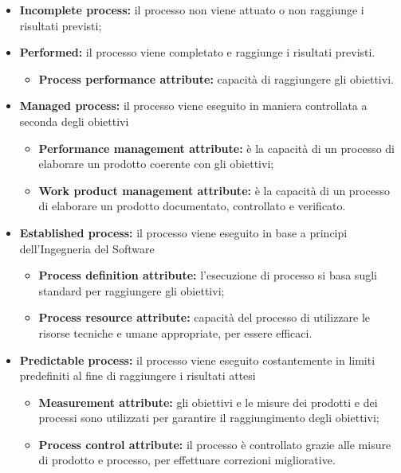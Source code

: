 \begin{itemize}
	\item \textbf{Incomplete process:} il processo non viene attuato o non raggiunge i risultati previsti;
	
	\item \textbf{Performed:} il processo viene completato e raggiunge i risultati previsti.
	\begin{itemize}
		\item\textbf{Process performance attribute:} capacità di raggiungere 
		gli obiettivi.
	\end{itemize}
	
	\item \textbf{Managed process:} il processo viene eseguito in maniera controllata a seconda degli obiettivi
	\begin{itemize}
		\item \textbf{Performance management attribute:} è la capacità di un processo di elaborare un prodotto coerente con gli obiettivi;
		\item \textbf{Work product management attribute:} è la capacità di un processo di elaborare un prodotto documentato, controllato e verificato.
	\end{itemize}
	
	\item \textbf{Established process:} il processo viene eseguito in base a 
	principi dell'Ingegneria del Software
	\begin{itemize}
		\item \textbf{Process definition attribute:} l'esecuzione di processo si basa sugli standard per raggiungere gli obiettivi;
		\item \textbf{Process resource attribute:} capacità del processo di utilizzare le risorse tecniche e umane appropriate, per essere efficaci.
	\end{itemize}
	
	\item \textbf{Predictable process:} il processo viene eseguito costantemente in limiti predefiniti al fine di raggiungere i risultati attesi
	\begin{itemize}
		\item \textbf{Measurement attribute:} gli obiettivi e le misure dei prodotti e dei processi sono utilizzati per garantire il raggiungimento degli obiettivi;
		\item \textbf{Process control attribute:} il processo è controllato grazie alle misure di prodotto e processo, per effettuare correzioni migliorative.
	\end{itemize}
	

\end{itemize}
